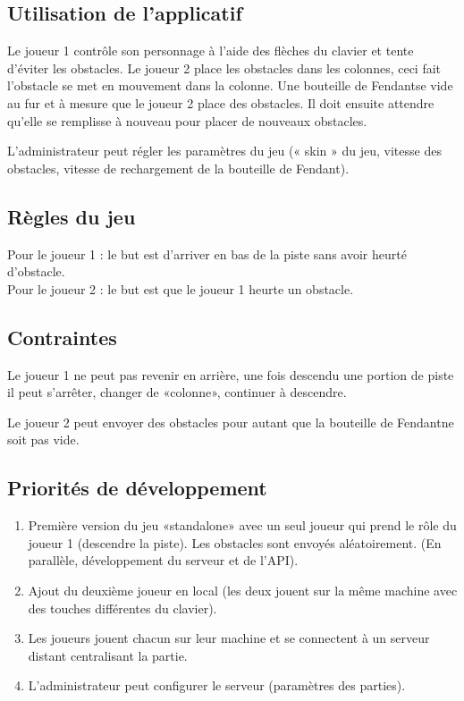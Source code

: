 \documentclass[a4paper,11pt]{article}
\begin{document}
	\subsection{Utilisation de l'applicatif}
	Le joueur 1 contrôle son personnage à l'aide des flèches du clavier et tente d'éviter les obstacles. Le joueur 2 place les obstacles dans les colonnes, ceci fait l'obstacle se met en mouvement dans la colonne. Une bouteille de Fendant\texttrademark se vide au fur et à mesure que le joueur 2 place des obstacles. Il doit ensuite attendre qu'elle se remplisse à nouveau pour placer de nouveaux obstacles.\par

	L'administrateur peut régler les paramètres du jeu (« skin » du jeu, vitesse des obstacles, vitesse de rechargement de la bouteille de Fendant\texttrademark).

	\subsection{Règles du jeu}
	Pour le joueur 1 : le but est d'arriver en bas de la piste sans avoir heurté d'obstacle. \\
	Pour le joueur 2 : le but est que le joueur 1 heurte un obstacle.

	\subsection{Contraintes}
	Le joueur 1 ne peut pas revenir en arrière, une fois descendu une portion de piste il peut s'arrêter, changer de «colonne», continuer à descendre. \par

	Le joueur 2 peut envoyer des obstacles pour autant que la bouteille de Fendant\texttrademark ne soit pas vide.

	\subsection{Priorités de développement}

	\begin{enumerate}
		\item Première version du jeu «standalone» avec un seul joueur qui prend le rôle du joueur 1 (descendre la piste). Les obstacles sont envoyés aléatoirement. (En parallèle, développement du serveur et de l'API).
		\item Ajout du deuxième joueur en local (les deux jouent sur la même machine avec des touches différentes du clavier).
		\item Les joueurs jouent chacun sur leur machine et se connectent à un serveur distant centralisant la partie.
		\item L'administrateur peut configurer le serveur (paramètres des parties).
	\end{enumerate}
\end{document}
